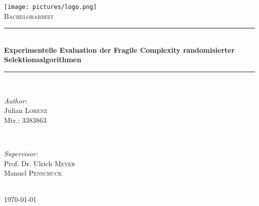 \begin{titlepage}

\newcommand{\HRule}{\rule{\linewidth}{0.5mm}} %

\center %
 
\label{Heading}
\texttt{[image: pictures/logo.png]}\\[1.5cm] %
\textsc{\Large Bachelorarbeit}\\[0.5cm] %

\label{Title Section}
\HRule \\[0.5cm]
{ \huge \bfseries Experimentelle Evaluation der Fragile Complexity randomisierter Selektionsalgorithmen}\\[0.3cm] %
\HRule \\[1.5cm]
 
\label{Author}
\begin{minipage}{0.4\textwidth}
\begin{flushleft} \large
\emph{Author:}\\
Julian \textsc{Lorenz}\\
Mtr.: 3383863 %
\end{flushleft}
\end{minipage}
~
\begin{minipage}{0.4\textwidth}
\begin{flushright} \large
\emph{Supervisor:} \\
Prof. Dr. Ulrich \textsc{Meyer}\\
Manuel \textsc{Penschuck}
\end{flushright}
\end{minipage}\\[4cm]


\label{Date}
{\large \today}\\[3cm] %


\end{titlepage}
